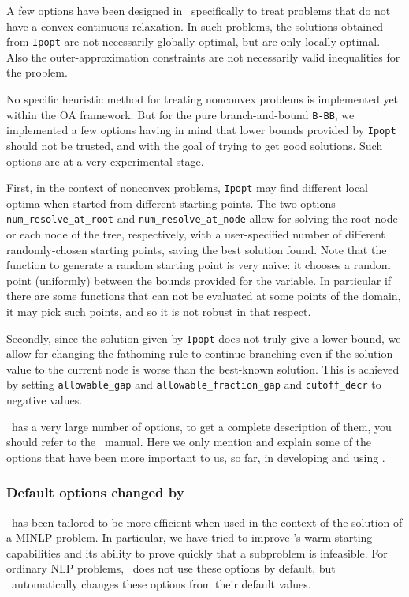 A few options have been designed in \Bonmin\ specifically to treat
problems that do not have a convex continuous relaxation.
In such problems, the solutions obtained from {\tt Ipopt} are
not necessarily globally optimal, but are only locally optimal. Also the outer-approximation
constraints are not necessarily valid inequalities for the problem.

No specific heuristic method for treating nonconvex problems is implemented
yet within the OA framework.
But for the pure branch-and-bound {\tt B-BB}, we implemented a few options having
in mind that lower bounds provided by {\tt Ipopt} should not be trusted, and with the goal of
trying to get good solutions. Such options are at a very experimental stage.

First, in the context of nonconvex problems, {\tt Ipopt} may find different local optima when started
from different starting points. The two options {\tt num\_re\-solve\_at\_root} and {\tt num\_resolve\_at\_node}
allow for solving the root node or each node of the tree, respectively, with a user-specified
number of different randomly-chosen
starting points, saving the best solution found. Note that the function to generate a random starting point
is very na\"{\i}ve: it chooses a random point (uniformly) between the bounds provided for the variable.
In particular if there are some functions
that can not be evaluated at some points of the domain, it may pick such points,
 and so it is not robust in that respect.

Secondly, since the solution given by {\tt Ipopt} does not truly give a lower bound, we allow for
changing the fathoming rule
to continue branching even if the solution value to the current node is worse
than the best-known
solution. This is achieved by setting {\tt allowable\_gap}
and {\tt allowable\_fraction\_gap} and {\tt cutoff\_decr} to negative values.

\Ipopt\ has a very large number of options, to get a complete description of them, you
should refer to the \Ipopt\ manual.
Here we only mention and explain some of the options that have been more important to us, so far,
in developing and using \Bonmin.
\subsubsection{Default options changed by \Bonmin}
\Ipopt\ has been tailored to be more efficient when used in the context of the
solution of a MINLP problem. In particular, we have tried to
improve \Ipopt's warm-starting capabilities and its ability to prove quickly that a subproblem
is infeasible. For ordinary NLP problems, \Ipopt\ does not use these options
by default, but \Bonmin\ automatically changes these options from their default values.

